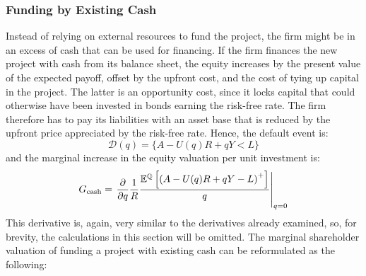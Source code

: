 \documentclass[main.tex]{subfiles}
\begin{document}
    \subsubsection{Funding by Existing Cash}
        Instead of relying on external resources to fund the project,
        the firm might be in an excess of cash that can be used for financing.
        If the firm finances the new project with cash from its balance sheet, 
        the equity increases by the present value of the expected payoff,
        offset by the upfront cost, and the cost of tying up capital in the project.
        The latter is an opportunity cost, since it locks capital
        that could otherwise have been invested in bonds earning the risk-free rate.
        The firm therefore has to pay its liabilities with an asset base that is
        reduced by the upfront price appreciated by the risk-free rate.
        Hence, the default event is:
            \begin{equation*}
                \mathcal{D}(q)
                = 
                \{
                    A - U(q)R + qY < L
                \}
            \end{equation*}
        and the marginal increase in the equity valuation per unit investment is:
            \begin{equation*}
                G_{\text{cash}} =
                    \left.
                    \frac{\partial }{\partial q} 
                    \frac{1}{R}
                    \frac{
                        \mathbb{E}^{\mathbb{Q}}\left[
                            \left(
                                A - U(q)R + qY - L
                            \right)^{+}
                        \right] 
                    }{
                        q
                    } 
                    \right\rvert_{q=0}
            \end{equation*}
        This derivative is, again, very similar to the derivatives already examined,
        so, for brevity, the calculations in this section will be omitted.
        The marginal shareholder valuation of funding a project with existing cash can be reformulated as the following:
\end{document}
